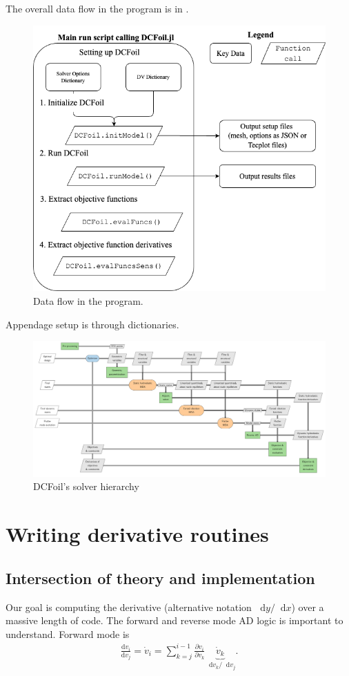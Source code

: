 \documentclass[10pt]{article}
\newcommand{\diff}{\mathop{}\!\tn{d}} %
\newcommand{\pp}[2]{\frac{\partial #1}{\partial #2}}
\newcommand{\dd}[2]{\frac{\textrm{d} #1}{\textrm{d} #2}}
\newcommand{\beq}{\begin{equation}\begin{aligned}}
\newcommand{\eeq}{\end{aligned}\end{equation}}
\newcommand{\tn}[1]{\textrm{#1}}
\begin{document}
The overall data flow in the program is in .
\begin{figure}[htb!]
	\centering
	\includegraphics[width=0.5\linewidth,clip,trim={0cm 0cm 0cm 0cm}]{dataFlow.png}
	\caption{\label{fig:DataFlow}Data flow in the program.}
\end{figure}
Appendage setup is through dictionaries.
\begin{landscape}

	\begin{figure}[htb!]
		\centering
		\includegraphics[width=\linewidth,clip,trim={0cm 0cm 0cm 0cm}]{dcfoil.pdf}
		\caption{\label{fig:XDSM}
			DCFoil's solver hierarchy
		}
	\end{figure}
\end{landscape}

\section{Writing derivative routines}
% 
\subsection{Intersection of theory and implementation}
Our goal is computing the derivative (alternative notation $\diff{y}/\diff{x}$) over a massive length of code.
The forward and reverse mode AD logic is important to understand.
Forward mode is
\beq
\dd{v_i}{v_j} = \dot{v}_i = \sum_{k=j}^{i-1}\pp{v_i}{v_k} \underbrace{\dot{v}_k}_{\diff{v_k}/\diff{v_j}}
.
\eeq
\end{document}
